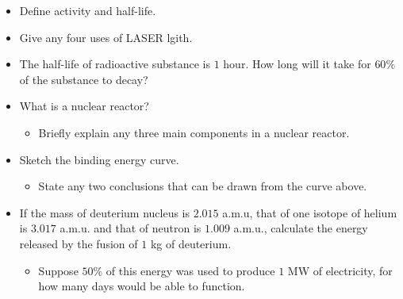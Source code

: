\documentclass{article}
\begin{document}
\begin{itemize}
\begin{itemize}
\end{itemize}
\item Define activity and half-life.
\item Give any four uses of LASER lgith.
\item The half-life of radioactive substance is $ 1$ hour.  How long will it take for $ 60\%$ of the substance to decay?
\item What is a nuclear reactor?
 \begin{itemize}
\item Briefly explain any three main components in a nuclear reactor.
\end{itemize}
\item Sketch the binding energy curve.
 \begin{itemize}
\item State any two conclusions that can be drawn from the curve above.
\end{itemize}
\item If the mass of deuterium nucleus is $ 2.015$ a.m.u, that of one isotope of helium is $ 3.017$ a.m.u. and that of neutron is $ 1.009$ a.m.u., calculate the energy released by the fusion of $ 1$ kg of deuterium. 
 \begin{itemize}
\item Suppose $ 50\%$ of this energy was used to produce $ 1$ MW of electricity, for how many days would be able to function.
\end{itemize}
\end{itemize}
\end{document}
